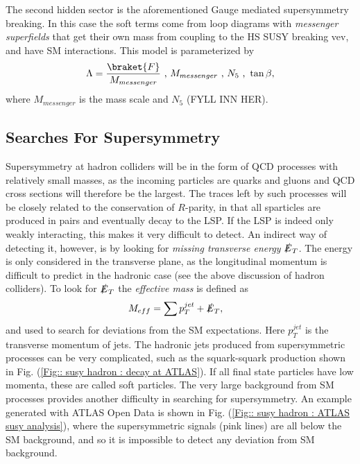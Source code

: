 \documentclass[twoside,english]{uiofysmaster}
\begin{document}
The second hidden sector is the aforementioned Gauge mediated supersymmetry breaking. In this case the soft terms come from loop diagrams with \textit{messenger superfields} that get their own mass from coupling to the HS SUSY breaking vev, and have SM interactions. This model is parameterized by 
\begin{align}
\Lambda = \frac{\braket{F}}{M_{messenger}} \text{ , } M_{messenger} \text{ , } N_5 \text{ , } \tan \beta,
\end{align}
where $M_{messenger}$ is the mass scale and $N_5$ (FYLL INN HER).

\subsection{Searches For Supersymmetry}

Supersymmetry at hadron colliders will be in the form of QCD processes with relatively small masses, as the incoming particles are quarks and gluons and QCD cross sections will therefore be the largest. The traces left by such processes will be closely related to the conservation of $R$-parity, in that all sparticles are produced in pairs and eventually decay to the LSP. If the LSP is indeed only weakly interacting, this makes it very difficult to detect. An indirect way of detecting it, however, is by looking for \textit{missing transverse energy} $\slashed{E}_T$. The energy is only considered in the transverse plane, as the longitudinal momentum is difficult to predict in the hadronic case (see the above discussion of hadron colliders). To look for $\slashed{E}_T$ the \textit{effective mass} is defined as
\begin{align}
M_{eff} &= \sum p_T^{jet} + \slashed{E}_T,
\end{align} 
and used to search for deviations from the SM expectations. Here $p_T^{jet}$ is the transverse momentum of jets. The hadronic jets produced from supersymmetric processes can be very complicated, such as the squark-squark production shown in Fig. (\ref{Fig:: susy hadron : decay at ATLAS}). If all final state particles have low momenta, these are called soft particles. The very large background from SM processes provides another difficulty in searching for supersymmetry. An example generated with ATLAS Open Data is shown in Fig. (\ref{Fig:: susy hadron : ATLAS susy analysis}), where the supersymmetric signals (pink lines) are all below the SM background, and so it is impossible to detect any deviation from SM background. 
\end{document}
